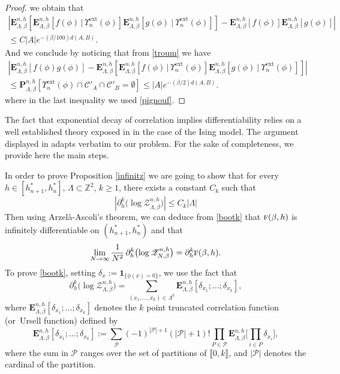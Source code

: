 \documentclass[JEP,XML,SOM,Unicode, NoFloatCountersInSection]{cedram}
\let\mathcal\mathscr
\numberwithin{equation}{section}
\theoremstyle{plain}
\theoremstyle{definition}
\newcommand{\ext}{\mathrm{ext}}
\newcommand{\lint}{\llbracket}
\newcommand{\rint}{\rrbracket}
\newcommand{\ind}{\mathbf{1}}
\newcommand{\cP}{{\ensuremath{\mathcal P}} }
\newcommand{\cC}{{\ensuremath{\mathcal C}} }
\newcommand{\cZ}{{\ensuremath{\mathcal Z}} }
\newcommand{\bP}{{\ensuremath{\mathbf P}} }
\newcommand{\bE}{{\ensuremath{\mathbf E}} }
\newcommand{\bbZ}{{\ensuremath{\mathbb Z}} }
\newcommand{\gb}{\beta}
\newcommand{\gL}{\Lambda}
\newcommand{\tf}{\textsc{f}}
\begin{document}
\begin{proof}
we obtain that
\begin{multline*}
\left| \bE^{n,h}_{\gL,\gb}\left[ \bE^{n,h}_{\gL,\gb}[f(\phi) \, | \, \Upsilon^{\ext}_n(\phi)] \bE^{n,h}_{\gL,\gb}[g(\phi) \ | \
\Upsilon^{\ext}_n(\phi)]\right] - \bE^{n,h}_{\gL,\gb}[f(\phi)] \bE^{n,h}_{\gL,\gb}[g(\phi)] \right|
\\ \le C|A|e^{-(\gb/100) d(A,B)}.
\end{multline*}
And we conclude by noticing that from \eqref{troum} we have
\begin{multline*}
\left| \bE^{n,h}_{\gL,\gb}[f(\phi)g(\phi)]- \bE^{n,h}_{\gL,\gb}\left[ \bE^{n,h}_{\gL,\gb}[f(\phi) \, | \, \Upsilon^{\ext}_n(\phi)] \bE^{n,h}_{\gL,\gb}[g(\phi) \ | \
\Upsilon^{\ext}_n(\phi)]\right]\right|\\ \le
\bP^{n,h}_{\gL,\gb}[\Upsilon^{\ext}_n(\phi)\cap \cC'_A \cap \cC'_B=\emptyset]\le |A|e^{-(\gb/2) d(A,B)}.
\end{multline*}
where in the last inequality we used \eqref{pignouf}.
\end{proof}

\label{laprov}

The fact that exponential decay of correlation implies differentiability relies
on a well established theory exposed \eg in \cite{cf:vDK} in the case of the Ising model.
The argument displayed in \cite{cf:vDK} adapts verbatim to our problem.
For the sake of completeness, we provide here the main steps.

In order to prove Proposition \ref{infinitz} we are going to show that
for every $h\in [h^*_{n+1},h^*_n]$, $\gL\subset \bbZ^2$, $k\ge 1$, there exists a constant $C_k$ such that
\begin{equation}\label{bootk}
\left|\partial^k_h\bigl(\log \cZ^{n,h}_{\gL,\gb}\bigr)\right|\le C_k |\gL|
\end{equation}
Then using Arzelà-Ascoli's theorem,
we can deduce from \eqref{bootk} that $\tf(\gb,h)$ is infinitely differentiable on $(h^*_{n+1},h^*_n)$ and that
\begin{equation}\label{koomits}
\lim_{N\to \infty}\frac{1}{N^2}\,\partial^k_h\bigl(\log \cZ^{n,h}_{N,\gb}\bigr)= \partial^k_h \tf(\gb,h).
\end{equation}
To prove \eqref{bootk}, setting $\delta_x:=\ind_{\{\phi(x)=0\}}$, we use the fact that
\begin{equation}\label{mood}
\partial^k_h\bigl(\log \cZ^{n,h}_{\gL,\gb}\bigr)= \sum_{(x_1,\dots,x_k)\in \gL^k} \bE^{n,h}_{\gL,\gb}\left[ \delta_{x_1} ; \dots ; \delta_{x_k} \right],
\end{equation}
where $\bE^{n,h}_{\gL,\gb}\left[ \delta_{x_1} ; \dots ; \delta_{x_k} \right]$ denotes the $k$ point truncated correlation function (or~Ursell function)
defined by
\begin{equation*}
\bE^{n,h}_{\gL,\gb}\left[ \delta_{x_1} ; \dots ; \delta_{x_k} \right]:=
\sum_{\cP} (-1)^{|\cP|+1}(|\cP|+1)! \prod_{P\in \cP}\bE^{n,h}_{\gL,\gb}\biggl[\prod_{i \in P} \delta_{x_i}\biggr],
\end{equation*}
where the sum in $\cP$ ranges over the set of partitions of $\lint 0,k \rint$, and $|\cP|$ denotes the cardinal of the partition.
\end{document}
